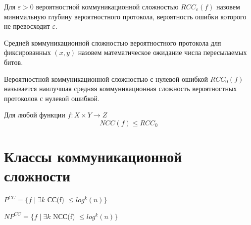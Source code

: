 \documentclass[12pt]{article}
\begin{document}
\begin{Def}
Для $\varepsilon>0$ вероятностной коммуникационной сложностью
$RCC_{\varepsilon}(f)$ назовем
минимальную глубину вероятностного протокола, вероятность ошибки которого не превосходит $\varepsilon$.
\end{Def}

\begin{Def}
Средней коммуникационной сложностью вероятностного протокола для фиксированных $(x, y)$ назовем математическое ожидание числа пересылаемых битов.
\end{Def}

\begin{Def}
Вероятностной коммуникационной сложностью с нулевой ошибкой
$RCC_0(f)$ называется наилучшая средняя коммуникационная сложность
вероятностных протоколов с нулевой ошибкой.
\end{Def}

\begin{Statement}
    Для любой функции $f \colon X \times Y \rightarrow Z$
    $$NCC(f) \leq RCC_0$$
\end{Statement}

\section{Классы коммуникационной сложности}
\begin{Def}
    $P^{CC} = \{f \; | \; \exists k $ СС(f) $\leq log^k(n)\}$
\end{Def}

\begin{Def}
    $NP^{CC} = \{f \; | \; \exists k$ NСС(f) $\leq log^k(n)\}$
\end{Def}
\end{document}
